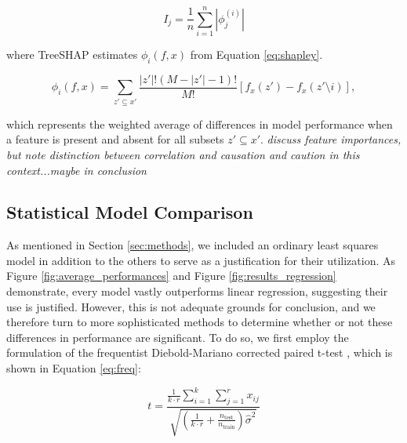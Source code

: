 \documentclass[fleqn,usenatbib]{mnras}
\begin{document}
\begin{equation}\label{eq:absolute_shap}
    I_j=\frac{1}{n}\sum_{i=1}^n{}|\phi_j^{(i)}|
\end{equation}

\noindent where TreeSHAP estimates $\phi_i(f,x)$ from Equation \ref{eq:shapley}.

\begin{equation}\label{eq:shapley}
    \phi_i(f,x) = \sum_{z' \subseteq x'} \frac{|z'|!(M - |z'| -1)!}{M!} \left [ f_x(z') - f_x(z' \setminus i) \right ],
\end{equation}

\noindent which represents the weighted average of differences in model performance when a feature is present and absent for all subsets $z'\subseteq x'$.
\textit{discuss feature importances, but note distinction between correlation and causation and caution in this context...maybe in conclusion}
\subsection{Statistical Model Comparison}

As mentioned in Section \ref{sec:methods}, we included an ordinary least squares model in addition to the others to serve as a justification for their utilization. As Figure \ref{fig:average_performances} and Figure \ref{fig:results_regression} demonstrate, every model vastly outperforms linear regression, suggesting their use is justified. However, this is not adequate grounds for conclusion, and we therefore turn to more sophisticated  methods to determine whether or not these differences in performance are significant. To do so, we first employ the \cite{nadeau_and_bengio} formulation of the frequentist Diebold-Mariano corrected paired t-test \citep{diebold_and_mariano}, which is shown in Equation \ref{eq:freq}: 



\begin{equation}\label{eq:freq}
    t=\frac{\frac{1}{k \cdot r}\sum_{i=1}^{k}\sum_{j=1}^{r}x_{ij}}
{\sqrt{(\frac{1}{k \cdot r}+\frac{n_{\mathrm{test}}}{n_{\mathrm{train}}})\hat{\sigma}^2}}
\end{equation}
\end{document}
